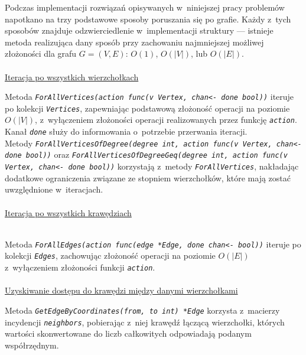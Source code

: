 {  Podczas implementacji rozwiązań opisywanych w~niniejszej pracy problemów napotkano na trzy podstawowe sposoby poruszania się po grafie.
  Każdy z~tych sposobów znajduje odzwierciedlenie w~implementacji struktury --- istnieje metoda realizująca dany sposób przy zachowaniu najmniejszej możliwej złożoności dla grafu $G=(V, E)$: $O(1)$, $O(|V|)$, lub $O(|E|)$.
  \\\\\underline{Iteracja po wszystkich wierzchołkach}\\
  \par{
      Metoda \textit{\lstinline{ForAllVertices(action func(v Vertex, chan<- done bool))}} iteruje po kolekcji \textit{\lstinline{Vertices}}, zapewniając  podstawową złożoność operacji na poziomie $O(|V|)$, z~wyłączeniem złożoności operacji realizowanych przez funkcję \textit{\lstinline{action}}. Kanał \textit{\lstinline{done}} służy do informowania o~potrzebie przerwania iteracji.\\
      Metody \textit{\lstinline{ForAllVerticesOfDegree(degree int, action func(v Vertex, chan<- done bool))}} oraz \textit{\lstinline{ForAllVerticesOfDegreeGeq(degree int, action func(v Vertex, chan<- done bool))}} korzystają z~metody \textit{\lstinline{ForAllVertices}}, nakładając dodatkowe ograniczenia związane ze stopniem wierzchołków, które mają zostać uwzględnione w~iteracjach.
  }
  \\\\\underline{Iteracja po wszystkich krawędziach}\\\
  \par{
      Metoda \textit{\lstinline{ForAllEdges(action func(edge *Edge, done chan<- bool))}} iteruje po kolekcji \textit{\lstinline{Edges}}, zachowując złożoność operacji na poziomie $O(|E|)$ z~wyłączeniem złożoności funkcji \textit{\lstinline{action}}.
  }
  \\\\\underline{Uzyskiwanie dostępu do krawędzi między danymi wierzchołkami}\\
  \par{
      Metoda \textit{\lstinline{GetEdgeByCoordinates(from, to int) *Edge}} korzysta z~macierzy incydencji \textit{\lstinline{neighbors}}, pobierając z~niej krawędź łączącą wierzchołki, których wartości skonwertowane do liczb całkowitych odpowiadają podanym współrzędnym.

}}
